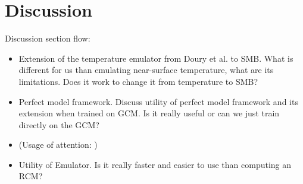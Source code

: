 \documentclass[a4paper,11pt,oneside]{report}
\begin{document}

\chapter{Discussion}
Discussion section flow:
\begin{itemize}
    \item Extension of the temperature emulator from Doury et al. to SMB. What is different for us than emulating near-surface temperature, what are its limitations. Does it work to change it from temperature to SMB? 
    \item Perfect model framework. Discuss utility of perfect model framework and its extension when trained on GCM. Is it really useful or can we just train directly on the GCM?  
    \item (Usage of attention: )
    \item Utility of Emulator. Is it really faster and easier to use than computing an RCM? 
\end{itemize}
\end{document}
